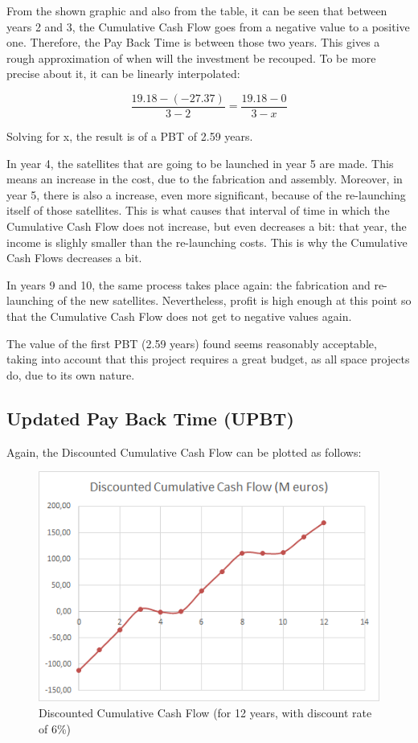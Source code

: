From the shown graphic and also from the table, it can be seen that between years 2 and 3, the Cumulative Cash Flow goes from a negative value to a positive one. Therefore, the Pay Back Time is between those two years. This gives a rough approximation of when will the investment be recouped. To be more precise about it, it can be linearly interpolated:

\begin{equation}
\frac{19.18-(-27.37)}{3-2}=\frac{19.18-0}{3-x}
\end{equation}

Solving for x, the result is of a PBT of 2.59 years.

In year 4, the satellites that are going to be launched in year 5 are made. This means an increase in the cost, due to the fabrication and assembly. Moreover, in year 5, there is also a increase, even more significant, because of the re-launching itself of those satellites. This is what causes that interval of time in which the Cumulative Cash Flow does not increase, but even decreases a bit: that year, the income is slighly smaller than the re-launching costs. This is why the Cumulative Cash Flows decreases a bit.

In years 9 and 10, the same process takes place again: the fabrication and re-launching of the new satellites. Nevertheless, profit is high enough at this point so that the Cumulative Cash Flow does not get to negative values again. 

The value of the first PBT (2.59 years) found seems reasonably acceptable, taking into account that this project requires a great budget, as all space projects do, due to its own nature. 

\subsection{Updated Pay Back Time (UPBT)}
Again, the Discounted Cumulative Cash Flow can be plotted as follows:

\begin{figure}[H]
	\centering
	\includegraphics{DCCF.png}
	\caption[Discounted Cumulative Cash Flow]{Discounted Cumulative Cash Flow (for 12 years, with discount rate of 6\%)}
\end{figure}

